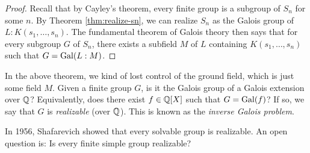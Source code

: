 \begin{proof}
  Recall that by Cayley's theorem, every finite group
  is a subgroup of $S_n$ for some $n$. By Theorem
  \ref{thm:realize-sn}, we can realize $S_n$ as the
  Galois group of $L : K(s_1, \dots, s_n)$. The
  fundamental theorem of Galois theory then says that
  for every subgroup $G$ of $S_n$, there exists a
  subfield $M$ of $L$ containing $K(s_1, \dots, s_n)$
  such that $G = \operatorname{Gal}(L : M)$.
\end{proof}

\begin{remark}
  In the above theorem, we kind of lost control of the
  ground field, which is just some field $M$. Given a
  finite group $G$, is it the Galois group of a Galois
  extension over $\mathbb{Q}$? Equivalently, does there exist
  $f \in \mathbb{Q}[X]$ such that $G = \operatorname{Gal}(f)$?
  If so, we say
  that $G$ is \emph{realizable} (over $\mathbb{Q}$).
  This is known
  as the \emph{inverse Galois problem}.
\end{remark}

\begin{remark}
  In 1956, Shafarevich showed that every solvable
  group is realizable. An open question is: Is every
  finite simple group realizable?
\end{remark}
